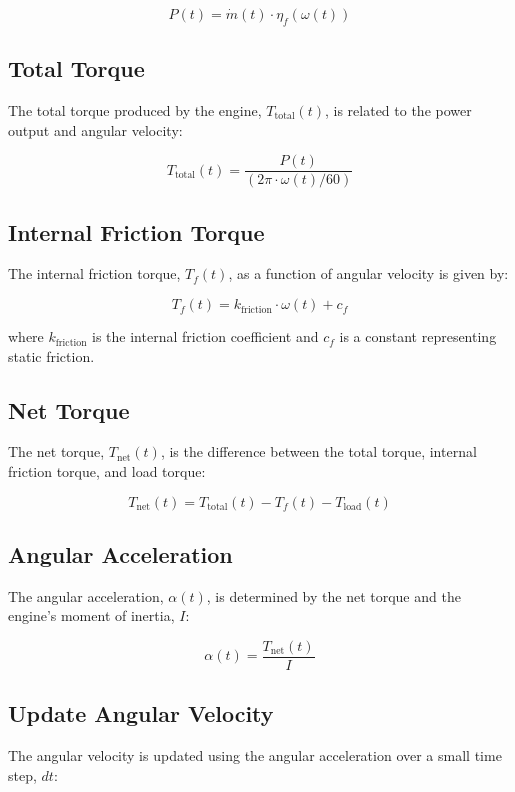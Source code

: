 \documentclass{article}
\begin{document}
\begin{equation}
P(t) = \dot{m}(t) \cdot \eta_f(\omega(t))
\end{equation}

\subsection{Total Torque}
The total torque produced by the engine, \(T_{\text{total}}(t)\), is related to the power output and angular velocity:

\begin{equation}
T_{\text{total}}(t) = \frac{P(t)}{(2 \pi \cdot \omega(t) / 60)}
\end{equation}

\subsection{Internal Friction Torque}
The internal friction torque, \(T_f(t)\), as a function of angular velocity is given by:

\begin{equation}
T_f(t) = k_{\text{friction}} \cdot \omega(t) + c_f
\end{equation}

where \(k_{\text{friction}}\) is the internal friction coefficient and \(c_f\) is a constant representing static friction.

\subsection{Net Torque}
The net torque, \(T_{\text{net}}(t)\), is the difference between the total torque, internal friction torque, and load torque:

\begin{equation}
T_{\text{net}}(t) = T_{\text{total}}(t) - T_f(t) - T_{\text{load}}(t)
\end{equation}

\subsection{Angular Acceleration}
The angular acceleration, \(\alpha(t)\), is determined by the net torque and the engine's moment of inertia, \(I\):

\begin{equation}
\alpha(t) = \frac{T_{\text{net}}(t)}{I}
\end{equation}

\subsection{Update Angular Velocity}
The angular velocity is updated using the angular acceleration over a small time step, \(dt\):
\end{document}
